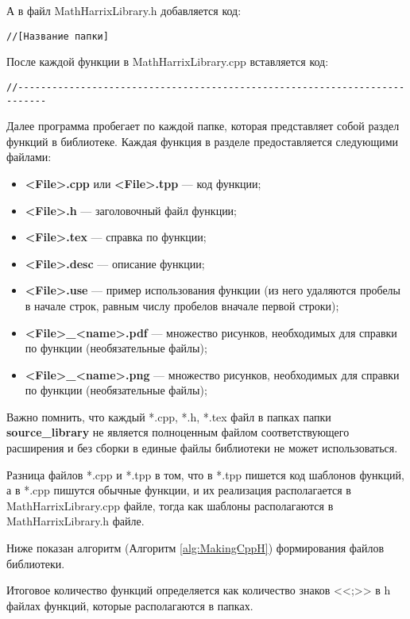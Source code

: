 \documentclass[a4paper,12pt]{article}
\begin{document}
А в файл MathHarrixLibrary.h добавляется код:

\begin{lstlisting}[label=make_sectionh,caption=Название раздела]
//[Название папки]
\end{lstlisting}

После каждой функции в MathHarrixLibrary.cpp вставляется код:
\begin{lstlisting}[label=make_sectionh,caption=Название раздела]
//---------------------------------------------------------------------------
\end{lstlisting}

Далее программа пробегает по каждой папке, которая представляет собой раздел функций в библиотеке. Каждая функция в разделе предоставляется следующими файлами:
\begin{itemize}
\item \textbf{<File>.cpp} или \textbf{<File>.tpp} --- код функции;
\item \textbf{<File>.h} --- заголовочный файл функции;
\item \textbf{<File>.tex} --- справка по функции;
\item \textbf{<File>.desc} --- описание функции;
\item \textbf{<File>.use} --- пример использования функции (из него удаляются пробелы в начале строк, равным числу пробелов вначале первой строки);
\item \textbf{<File>\_<name>.pdf} --- множество рисунков, необходимых для справки по функции (необязательные файлы);
\item \textbf{<File>\_<name>.png} --- множество рисунков, необходимых для справки по функции (необязательные файлы);
\end{itemize}

Важно помнить, что каждый *.cpp, *.h, *.tex файл в папках папки \textbf{source\_library} не является полноценным файлом соответствующего расширения и без сборки в единые файлы библиотеки не может использоваться.

Разница файлов *.cpp и *.tpp в том, что в *.tpp  пишется код шаблонов функций, а в *.cpp пишутся обычные функции, и их реализация располагается в MathHarrixLibrary.cpp файле, тогда как шаблоны располагаются в MathHarrixLibrary.h файле.

Ниже показан алгоритм (Алгоритм \ref{alg:MakingCppH}) формирования файлов библиотеки.

Итоговое количество функций определяется как количество знаков <<;>> в h файлах функций, которые располагаются в папках.
\end{document}
